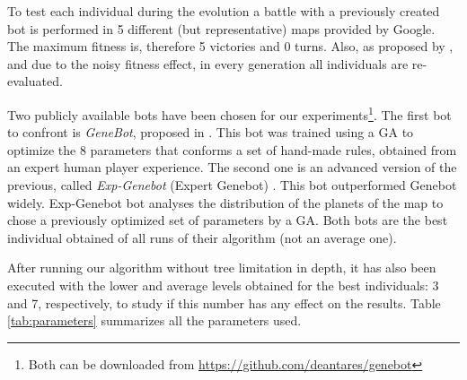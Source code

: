 To test each individual during the evolution a battle with a previously created bot is performed in 5 different (but representative) maps provided by Google. The maximum fitness is, therefore 5 victories and 0 turns. Also, as proposed by \cite{Mora2012Genebot}, and due to the noisy fitness effect, in every generation all individuals are re-evaluated.


Two publicly available bots have been chosen for our experiments\footnote{Both can be downloaded from \url{https://github.com/deantares/genebot}}. The first bot to confront is {\em GeneBot}, proposed in \cite{Mora2012Genebot}. This bot was trained using a GA to optimize the 8 parameters that conforms a set of hand-made rules, obtained from an expert human player experience. The second one is an advanced version of the previous, called {\em Exp-Genebot} (Expert Genebot) \cite{FernandezAres2012adaptive}. This bot outperformed Genebot widely. Exp-Genebot bot analyses the distribution of the planets of the map to chose a previously optimized set of parameters by a GA.  Both bots are the best individual obtained of all runs of their algorithm (not an average one).

After running our algorithm without tree limitation in depth, it has also been executed with the lower and average levels obtained for the best individuals: 3 and 7, respectively, to study if this number has any effect on the results.   Table \ref{tab:parameters} summarizes all the parameters used.

